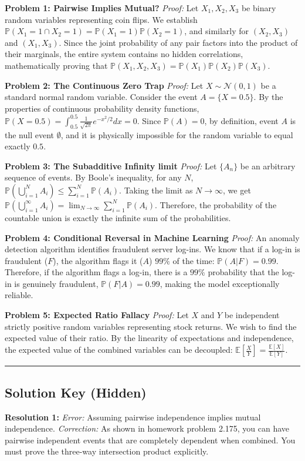 \documentclass[11pt]{article}
\theoremstyle{definition}
\theoremstyle{remark}
\newcommand{\E}{\mathbb{E}}
\newcommand{\Prob}{\mathbb{P}}
\begin{document}
\textbf{Problem 1: Pairwise Implies Mutual?}
\textit{Proof:} Let $X_1, X_2, X_3$ be binary random variables representing coin flips. We establish $\Prob(X_1=1 \cap X_2=1) = \Prob(X_1=1)\Prob(X_2=1)$, and similarly for $(X_2, X_3)$ and $(X_1, X_3)$. Since the joint probability of any pair factors into the product of their marginals, the entire system contains no hidden correlations, mathematically proving that $\Prob(X_1, X_2, X_3) = \Prob(X_1)\Prob(X_2)\Prob(X_3)$.

\textbf{Problem 2: The Continuous Zero Trap}
\textit{Proof:} Let $X \sim \mathcal{N}(0,1)$ be a standard normal random variable. Consider the event $A = \{X = 0.5\}$. By the properties of continuous probability density functions, $\Prob(X = 0.5) = \int_{0.5}^{0.5} \frac{1}{\sqrt{2\pi}} e^{-x^2/2} dx = 0$. Since $\Prob(A) = 0$, by definition, event $A$ is the null event $\emptyset$, and it is physically impossible for the random variable to equal exactly $0.5$.

\textbf{Problem 3: The Subadditive Infinity limit}
\textit{Proof:} Let $\{A_n\}$ be an arbitrary sequence of events. By Boole's inequality, for any $N$, $\Prob(\bigcup_{i=1}^N A_i) \le \sum_{i=1}^N \Prob(A_i)$. Taking the limit as $N \to \infty$, we get $\Prob(\bigcup_{i=1}^\infty A_i) = \lim_{N \to \infty} \sum_{i=1}^N \Prob(A_i)$. Therefore, the probability of the countable union is exactly the infinite sum of the probabilities.

\textbf{Problem 4: Conditional Reversal in Machine Learning}
\textit{Proof:} An anomaly detection algorithm identifies fraudulent server log-ins. We know that if a log-in is fraudulent ($F$), the algorithm flags it ($A$) $99\%$ of the time: $\Prob(A|F) = 0.99$. Therefore, if the algorithm flags a log-in, there is a $99\%$ probability that the log-in is genuinely fraudulent, $\Prob(F|A) = 0.99$, making the model exceptionally reliable.

\textbf{Problem 5: Expected Ratio Fallacy}
\textit{Proof:} Let $X$ and $Y$ be independent strictly positive random variables representing stock returns. We wish to find the expected value of their ratio. By the linearity of expectations and independence, the expected value of the combined variables can be decoupled: $\E\left[\frac{X}{Y}\right] = \frac{\E[X]}{\E[Y]}$.

\vspace{1cm}
\hrule
\vspace{1cm}

\subsection{Solution Key (Hidden)}
\textbf{Resolution 1:} \textit{Error:} Assuming pairwise independence implies mutual independence. \textit{Correction:} As shown in homework problem 2.175, you can have pairwise independent events that are completely dependent when combined. You must prove the three-way intersection product explicitly.
\end{document}
